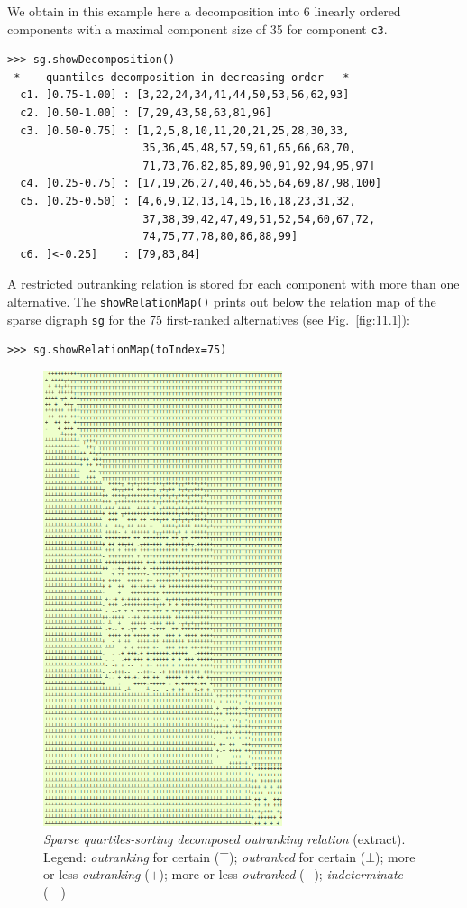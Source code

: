 We obtain in this example here a decomposition into 6 linearly ordered components with a maximal component size of 35 for component \texttt{c3}.

\begin{lstlisting}[caption={The 6 components of a sparse outranking digraph},label=list:11.4]
>>> sg.showDecomposition()
 *--- quantiles decomposition in decreasing order---*
  c1. ]0.75-1.00] : [3,22,24,34,41,44,50,53,56,62,93]
  c2. ]0.50-1.00] : [7,29,43,58,63,81,96]
  c3. ]0.50-0.75] : [1,2,5,8,10,11,20,21,25,28,30,33,
                     35,36,45,48,57,59,61,65,66,68,70,
                     71,73,76,82,85,89,90,91,92,94,95,97]
  c4. ]0.25-0.75] : [17,19,26,27,40,46,55,64,69,87,98,100]
  c5. ]0.25-0.50] : [4,6,9,12,13,14,15,16,18,23,31,32,
                     37,38,39,42,47,49,51,52,54,60,67,72,
                     74,75,77,78,80,86,88,99]
  c6. ]<-0.25]    : [79,83,84]
\end{lstlisting}

A restricted outranking relation is stored for each component with more than one alternative. The \texttt{showRelationMap()} prints out below the relation map of the sparse digraph \texttt{sg} for the 75 first-ranked alternatives (see Fig.~\vref{fig:11.1}):
\begin{lstlisting}
>>> sg.showRelationMap(toIndex=75)
\end{lstlisting}  
\begin{figure}[ht]
\sidecaption[t]
\includegraphics[width=7cm]{Figures/11-1-sparseRelationMap.png}
\caption[Sparse quartiles-sorting decomposed outranking relation]{\emph{Sparse quartiles-sorting decomposed outranking relation} (extract). Legend: \emph{outranking} for certain ($\top$); \emph{outranked} for certain ($\bot$); more or less \emph{outranking} ($+$); more or less \emph{outranked} ($-$); \emph{indeterminate} (\ \ )}
\label{fig:11.1}       %
\end{figure}

